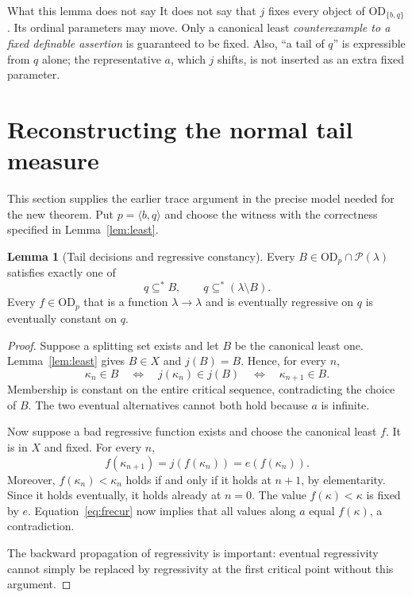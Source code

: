 \documentclass[11pt,letterpaper]{article}
\theoremstyle{definition}
\newtheorem{lemma}[definition]{Lemma}
\numberwithin{equation}{section}
\newcommand{\OD}{\mathrm{OD}}
\newcommand{\Pow}{\mathcal P}
\newcommand{\pair}[2]{\langle #1,#2\rangle}
\newcommand{\substar}{\subseteq^{*}}
\begin{document}
\begin{assessment}{What this lemma does not say}
It does not say that $j$ fixes every object of $\OD_{\{b,q\}}$. Its ordinal parameters may move. Only a canonical least \emph{counterexample to a fixed definable assertion} is guaranteed to be fixed. Also, ``a tail of $q$'' is expressible from $q$ alone; the representative $a$, which $j$ shifts, is not inserted as an extra fixed parameter.
\end{assessment}

\section{Reconstructing the normal tail measure}\label{sec:measure}

This section supplies the earlier trace argument in the precise model needed for the new theorem. Put $p=\pair bq$ and choose the witness with the correctness specified in Lemma~\ref{lem:least}.

\begin{lemma}[Tail decisions and regressive constancy]\label{lem:decide}
Every $B\in\OD_p\cap\Pow(\lambda)$ satisfies exactly one of
\[
 q\substar B,\qquad q\substar(\lambda\setminus B).
\]
Every $f\in\OD_p$ that is a function $\lambda\to\lambda$ and is eventually regressive on $q$ is eventually constant on $q$.
\end{lemma}

\begin{proof}
Suppose a splitting set exists and let $B$ be the canonical least one. Lemma~\ref{lem:least} gives $B\in X$ and $j(B)=B$. Hence, for every $n$,
\[
 \kappa_n\in B\quad\Longleftrightarrow\quad
 j(\kappa_n)\in j(B)\quad\Longleftrightarrow\quad\kappa_{n+1}\in B.
\]
Membership is constant on the entire critical sequence, contradicting the choice of $B$. The two eventual alternatives cannot both hold because $a$ is infinite.

Now suppose a bad regressive function exists and choose the canonical least $f$. It is in $X$ and fixed. For every $n$,
\begin{equation}\label{eq:frecur}
 f(\kappa_{n+1})=j(f(\kappa_n))=e(f(\kappa_n)).
\end{equation}
Moreover, $f(\kappa_n)<\kappa_n$ holds if and only if it holds at $n+1$, by elementarity. Since it holds eventually, it holds already at $n=0$. The value $f(\kappa)<\kappa$ is fixed by $e$. Equation~\eqref{eq:frecur} now implies that all values along $a$ equal $f(\kappa)$, a contradiction.

The backward propagation of regressivity is important: eventual regressivity cannot simply be replaced by regressivity at the first critical point without this argument.
\end{proof}
\end{document}
